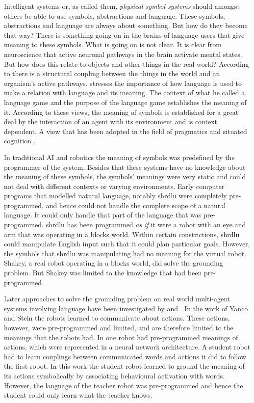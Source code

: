 Intelligent systems or, as \citet{newell:1980} called them, {\em physical symbol systems} should amongst others be able to use symbols, abstractions and language. These symbols, abstractions and language are always about something. But how do they become that way? There is something going on in the brains of language users that give meaning to these symbols. What is going on is not clear. It is clear from neuroscience that active neuronal pathways in the brain activate mental states. But how does this relate to objects and other things in the real world? According to \citet{maturanavarela:1992} there is a structural coupling between the things in the world and an organism's active pathways. \citet{wittgenstein:1958} stresses the importance of how language is used to make a relation with language and its meaning. The context of what he called a language game and the purpose of the language game establishes the meaning of it. According to these views, the meaning of symbols is established for a great deal by the interaction of an agent with its environment and is context dependent. A view that has been adopted in the field of pragmatics and situated cognition \citep{clancey:1997}.

In traditional AI and robotics the meaning of symbols was predefined by the programmer of the system. Besides that these systems have no knowledge about the meaning of these symbols, the symbols' meanings were very static and could not deal with different contexts or varying environments. Early computer programs that modelled natural language, notably {\sc shrdlu} \citep{winograd:1972} were completely pre-programmed, and hence could not handle the complete scope of a natural language. It could only handle that part of the language that was pre-programmed. {\sc shrdlu} has been programmed {\em as if} it were a robot with an eye and arm that was operating in a blocks world. Within certain constrictions, {\sc shrdlu} could manipulate English input such that it could plan particular goals. However, the symbols that {\sc shrdlu} was manipulating had no meaning for the virtual robot. Shakey, a real robot operating in a blocks world, did solve the grounding problem. But Shakey was limited to the knowledge that had been pre-programmed.

Later approaches to solve the grounding problem on real world multi-agent systems involving language have been investigated by \citet{yancostein} and \citet{billard:1997a}. In the work of Yanco and Stein the robots learned to communicate about actions. These actions, however, were pre-programmed and limited, and are therefore limited to the meanings that the robots had. In \citet{billard:1997a} one robot had pre-programmed meanings of actions, which were represented in a neural network architecture. A student robot had to learn couplings between communicated words and actions it did to follow the first robot. In this work the student robot learned to ground the meaning of its actions symbolically by associating behavioural activation with words. However, the language of the teacher robot was pre-programmed and hence the student could only learn what the teacher knows.

